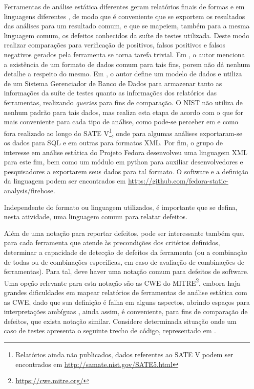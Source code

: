 Ferramentas de análise estática diferentes geram relatórios finais de formas e em linguagens diferentes \cite{nsa}, de modo que é conveniente que se exportem os resultados das análises para um resultado comum, e que se mapeiem, também para a mesma linguagem comum, os defeitos conhecidos da suíte de testes utilizada. Deste modo realizar comparações para verificação de positivos, falsos positivos e falsos negativos gerados pela ferramenta se torna tarefa trivial. Em \cite{nsa}, o autor menciona a existência de um formato de dados comum para tais fins, porem não dá nenhum detalhe a respeito do mesmo. Em \cite{harvard}, o autor define um modelo de dados e utiliza de um Sistema Gerenciador de Banco de Dados para armazenar tanto as informações da suíte de testes quanto as informações dos relatórios das ferramentas, realizando \textit{queries} para fins de comparação. O NIST não utiliza de nenhum padrão para tais dados, mas realiza esta etapa de acordo com o que for mais conveniente para cada tipo de análise, como pode-se perceber em \cite{sate_iv} e como fora realizado ao longo do SATE V\footnote{Relatórios ainda não publicados, dados referentes ao SATE V podem ser encontrados em \url{http://samate.nist.gov/SATE5.html}}, onde para algumas análises exportaram-se os dados para SQL e em outras para formatos XML. Por fim, o grupo de interesse em análise estática do Projeto Fedora desenvolveu uma linguagem XML para este fim, bem como um módulo em python para auxiliar desenvolvedores e pesquisadores a exportarem seus dados para tal formato. O software e a definição da linguagem podem ser encontrados em \url{https://github.com/fedora-static-analysis/firehose}.

Independente do formato ou linguagem utilizados, é importante que se defina, nesta atividade, uma linguagem comum para relatar defeitos.

Além de uma notação para reportar defeitos, pode ser interessante também que, para cada ferramenta que atende às precondições dos critérios definidos, determinar a capacidade de detecção de defeitos da ferramenta (ou a combinação de todas ou de combinações específicas, em caso de avaliação de combinações de ferramentas). Para tal, deve haver uma notação comum para defeitos de software.  Uma opção relevante para esta notação são as CWE do  MITRE\footnote{\url{https://cwe.mitre.org/}}, embora haja grandes dificuldades em mapear relatórios de ferramentas de análise estática com as CWE, dado que sua definição é falha em alguns aspectos, abrindo espaços para interpretações ambíguas \cite{yan}, ainda assim, é conveniente, para fins de comparação de defeitos, que exista notação similar. Considere determinada situação onde um caso de testes apresenta o seguinte trecho de código, representado em .

